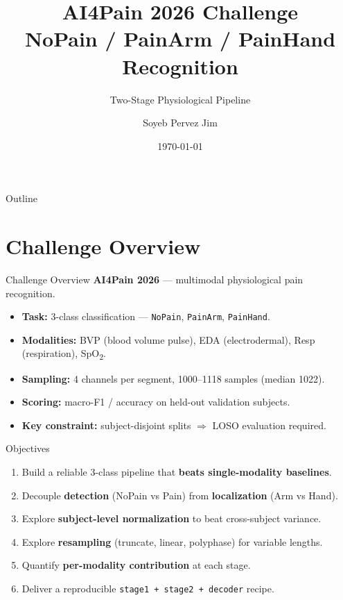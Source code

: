 \documentclass[aspectratio=169,10pt]{beamer}
\title[AI4Pain 2026]{AI4Pain 2026 Challenge \\ NoPain / PainArm / PainHand Recognition}
\subtitle{Two-Stage Physiological Pipeline}
\author{Soyeb Pervez Jim}
\institute{Department of EEE, University of Dhaka}
\date{\today}
\begin{document}
\begin{frame}
  \titlepage
\end{frame}

\begin{frame}{Outline}
  \tableofcontents
\end{frame}

\section{Challenge Overview}

\begin{frame}{Challenge Overview}
  \textbf{AI4Pain 2026} — multimodal physiological pain recognition.
  \begin{itemize}
    \item \textbf{Task:} 3-class classification — \texttt{NoPain}, \texttt{PainArm}, \texttt{PainHand}.
    \item \textbf{Modalities:} BVP (blood volume pulse), EDA (electrodermal), Resp (respiration), SpO\textsubscript{2}.
    \item \textbf{Sampling:} 4 channels per segment, 1000--1118 samples (median 1022).
    \item \textbf{Scoring:} macro-F1 / accuracy on held-out validation subjects.
    \item \textbf{Key constraint:} subject-disjoint splits $\Rightarrow$ LOSO evaluation required.
  \end{itemize}
\end{frame}

\begin{frame}{Objectives}
  \begin{enumerate}
    \item Build a reliable 3-class pipeline that \textbf{beats single-modality baselines}.
    \item Decouple \textbf{detection} (NoPain vs Pain) from \textbf{localization} (Arm vs Hand).
    \item Explore \textbf{subject-level normalization} to beat cross-subject variance.
    \item Explore \textbf{resampling} (truncate, linear, polyphase) for variable lengths.
    \item Quantify \textbf{per-modality contribution} at each stage.
    \item Deliver a reproducible \texttt{stage1 + stage2 + decoder} recipe.
  \end{enumerate}
\end{frame}
\end{document}
